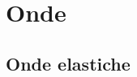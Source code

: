 \documentclass[a4paper,11pt,italian]{article}
\begin{document}
\begin{description}
%

%   
%   
%
\end{description}


\newpage
\section{Onde}

\subsection{Onde elastiche}
\end{document}
